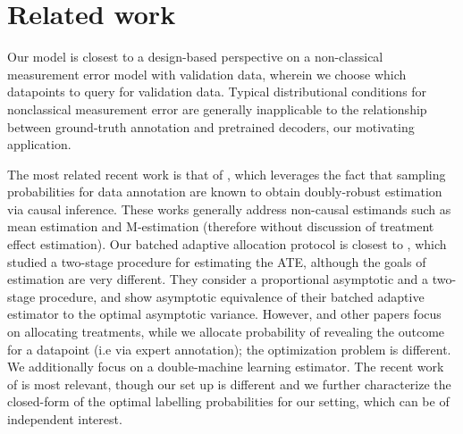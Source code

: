 \section{Related work}
Our model is closest to a design-based perspective on a non-classical measurement error model with validation data, wherein we choose which datapoints to query for validation data. Typical distributional conditions for nonclassical measurement error \citep{schennach2016recent} are generally inapplicable to the relationship between ground-truth annotation and pretrained decoders, our motivating application. 

The most related recent work is that of \cite{naoki2023dsl,zrnic2024active}, which leverages the fact that sampling probabilities for data annotation are known to obtain doubly-robust estimation via causal inference. These works generally address non-causal estimands such as mean estimation and M-estimation (therefore without discussion of treatment effect estimation). 
Our batched adaptive allocation protocol is closest to \citep{hahn2011adaptive}, which studied a two-stage procedure for estimating the ATE, although the goals of estimation are very different. They consider a proportional asymptotic and a two-stage procedure, and show asymptotic equivalence of their batched adaptive estimator to the optimal asymptotic variance. However, \citep{hahn2011adaptive} and other papers focus on allocating treatments, while we allocate probability of revealing the outcome for a datapoint (i.e via expert annotation); the optimization problem is different. We additionally focus on a double-machine learning estimator. The recent work of \citep{li2024double} is most relevant, though our set up is different and we further characterize the closed-form of the optimal labelling probabilities for our setting, which can be of independent interest. 




